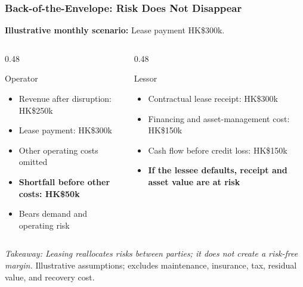 \documentclass{beamer}
\begin{document}
\begin{frame}[t,shrink=12]
\frametitle{Back-of-the-Envelope: Risk Does Not Disappear}
\textbf{Illustrative monthly scenario:} Lease payment HK\$300k.
\begin{columns}[T]
\begin{column}{0.48\textwidth}\begin{block}{Operator}
\begin{itemize}
\item Revenue after disruption: HK\$250k
\item Lease payment: HK\$300k
\item Other operating costs omitted
\item \textbf{Shortfall before other costs: HK\$50k}
\item Bears demand and operating risk
\end{itemize}\end{block}\end{column}
\begin{column}{0.48\textwidth}\begin{block}{Lessor}
\begin{itemize}
\item Contractual lease receipt: HK\$300k
\item Financing and asset-management cost: HK\$150k
\item Cash flow before credit loss: HK\$150k
\item \textbf{If the lessee defaults, receipt and asset value are at risk}
\end{itemize}\end{block}\end{column}
\end{columns}
\textit{Takeaway: Leasing reallocates risks between parties; it does not create a risk-free margin.}
\vfill{\tiny Illustrative assumptions; excludes maintenance, insurance, tax, residual value, and recovery cost.}
\end{frame}
\end{document}
